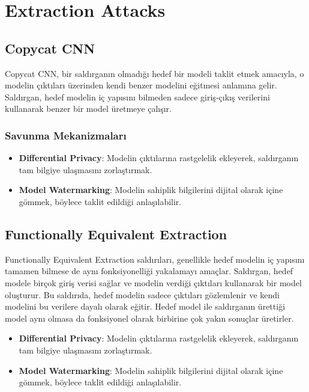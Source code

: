 \section{Extraction Attacks}

\subsection{Copycat CNN}

Copycat CNN, bir saldırganın olmadığı hedef bir modeli taklit etmek amacıyla, o modelin çıktıları üzerinden kendi benzer modelini eğitmesi anlamına gelir. Saldırgan, hedef modelin iç yapısını bilmeden sadece giriş-çıkış verilerini kullanarak benzer bir model üretmeye çalışır.

\subsubsection{Savunma Mekanizmaları}

\begin{itemize}
    \item \textbf{Differential Privacy}: Modelin çıktılarına rastgelelik ekleyerek, saldırganın tam bilgiye ulaşmasını zorlaştırmak.
    \item \textbf{Model Watermarking}: Modelin sahiplik bilgilerini dijital olarak içine gömmek, böylece taklit edildiği anlaşılabilir.
\end{itemize}

\newpage

\subsection{Functionally Equivalent Extraction}

Functionally Equivalent Extraction saldırıları, genellikle hedef modelin iç yapısını tamamen bilmese de aynı fonksiyonelliği yakalamayı amaçlar. Saldırgan, hedef modele birçok giriş verisi sağlar ve modelin verdiği çıktıları kullanarak bir model oluşturur. Bu saldırıda, hedef modelin sadece çıktıları gözlemlenir ve kendi modelini bu verilere dayalı olarak eğitir. Hedef model ile saldırganın ürettiği model aynı olmasa da fonksiyonel olarak birbirine çok yakın sonuçlar üretirler.

\begin{itemize}
    \item \textbf{Differential Privacy}: Modelin çıktılarına rastgelelik ekleyerek, saldırganın tam bilgiye ulaşmasını zorlaştırmak.
    \item \textbf{Model Watermarking}: Modelin sahiplik bilgilerini dijital olarak içine gömmek, böylece taklit edildiği anlaşılabilir.
\end{itemize}

